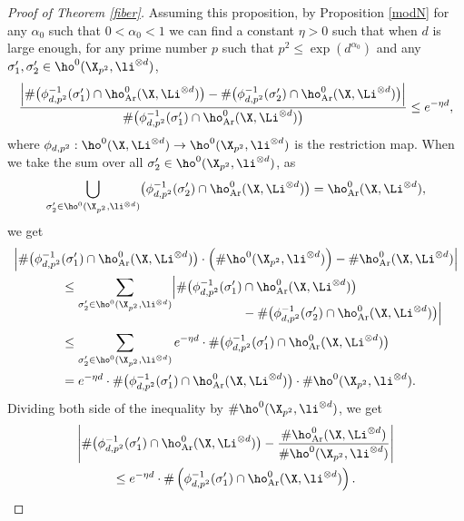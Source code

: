 \begin{proof}[Proof of Theorem \ref{fiber}]
Assuming this proposition, by Proposition \ref{modN} for any $\alpha_0$ such that $0<\alpha_0<1$ we can find a constant $\eta>0$ such that when $d$ is large enough, for any prime number $p$ such that $p^2\leq \exp(d^{\alpha_0})$ and any $\sigma'_1,\sigma'_2\in \ho^0(\X_{p^2}, \li^{\otimes d})$,
\begin{align*}
\frac{\left| \#\bigl(\phi_{d,p^2}^{-1}(\sigma'_1)\cap \ho^0_{\mathrm{Ar}}(\X, \Li^{\otimes d}) \bigr)-\#\bigl(\phi_{d,p^2}^{-1}(\sigma'_2)\cap \ho^0_{\mathrm{Ar}}(\X, \Li^{\otimes d}) \bigr) \right|}{\#\bigl(\phi_{d,p^2}^{-1}(\sigma'_1)\cap \ho^0_{\mathrm{Ar}}(\X, \Li^{\otimes d}) \bigr)} \leq e^{-\eta d} ,
\end{align*}
where $\phi_{d,p^2}: \ho^0(\X, \Li^{\otimes d}) \to \ho^0(\X_{p^2}, \li^{\otimes d})$ is the restriction map.
When we take the sum over all $\sigma'_2\in \ho^0(\X_{p^2}, \li^{\otimes d})$, as
\[
\bigcup_{\sigma'_2\in \ho^0(\X_{p^2}, \li^{\otimes d})} \bigl(\phi_{d,p^2}^{-1}(\sigma'_2)\cap \ho^0_{\mathrm{Ar}}(\X, \Li^{\otimes d}) \bigr)= \ho^0_{\mathrm{Ar}}(\X, \Li^{\otimes d}),
\]
we get
\begin{align*}
\Bigl| \#\bigl(\phi_{d,p^2}^{-1}&(\sigma'_1)\cap \ho^0_{\mathrm{Ar}}(\X, \Li^{\otimes d}) \bigr)\cdot \left(\# \ho^0(\X_{p^2}, \li^{\otimes d}) \right)-\# \ho^0_{\mathrm{Ar}}(\X, \Li^{\otimes d}) \Bigr| \\
&\leq \sum_{\sigma'_2\in \ho^0(\X_{p^2}, \li^{\otimes d})}\Bigl| \#\bigl(\phi_{d,p^2}^{-1}(\sigma'_1)\cap \ho^0_{\mathrm{Ar}}(\X, \Li^{\otimes d}) \bigr)\\[-12pt]
&\hspace*{5cm}-\#\bigl(\phi_{d,p^2}^{-1}(\sigma'_2)\cap \ho^0_{\mathrm{Ar}}(\X, \Li^{\otimes d}) \bigr) \Bigr|\\[2pt]
&\leq \sum_{\sigma'_2\in \ho^0(\X_{p^2}, \li^{\otimes d})} e^{-\eta d}\cdot \#\bigl(\phi_{d,p^2}^{-1}(\sigma'_1)\cap \ho^0_{\mathrm{Ar}}(\X, \Li^{\otimes d}) \bigr)\\
&= e^{-\eta d}\cdot \#\bigl(\phi_{d,p^2}^{-1}(\sigma'_1)\cap \ho^0_{\mathrm{Ar}}(\X, \Li^{\otimes d}) \bigr)\cdot \#\ho^0(\X_{p^2}, \li^{\otimes d}).
\end{align*}
Dividing both side of the inequality by $\#\ho^0(\X_{p^2}, \li^{\otimes d})$, we get
\begin{multline*}
\left| \#\bigl(\phi_{d,p^2}^{-1}(\sigma'_1)\cap \ho^0_{\mathrm{Ar}}(\X, \Li^{\otimes d}) \bigr)-\frac{\#\ho^0_{\mathrm{Ar}}(\X, \Li^{\otimes d})}{\#\ho^0(\X_{p^2}, \li^{\otimes d})} \right|\\
\leq e^{-\eta d}\cdot \#\left(\phi_{d,p^2}^{-1}(\sigma'_1)\cap \ho^0_{\mathrm{Ar}}(\X, \li^{\otimes d}) \right).
\end{multline*}


\end{proof}
